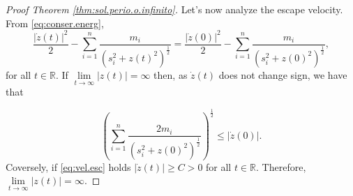 \documentclass[twoside]{article}
\theoremstyle{remark}
\newcommand{\rr}{\mathbb{R}}
\begin{document}
\begin{proof}[Proof  Theorem \ref{thm:sol.perio.o.infinito}]
Let's now analyze the escape velocity. From \eqref{eq:conser.energ}, 
\[\frac{|\dot{z}(t)|^2}{2}-\sum_{i=1}^{n} \frac{m_i}{\left(s_i^2+z(t)^2\right)^{\frac12}}=\frac{|\dot{z}(0)|^2}{2}-\sum_{i=1}^{n} \frac{m_i}{\left(s_i^2+z(0)^2\right)^{\frac12}},\]
for all $t\in\rr$. If $\lim\limits_{t\to\infty}|z(t)|=\infty$ then, as $\dot{z}(t)$ does not change sign, we have that

\begin{equation}\label{eq:vel.esc}
\left(\sum_{i=1}^{n} \frac{2m_i}{\left(s_i^2+z(0)^2\right)^{\frac12}}\right)^{\frac12}\leq |\dot{z}(0)|.
\end{equation}
Coversely, if \eqref{eq:vel.esc} holds $|\dot{z}(t)|\geq C>0$ for all $t\in\rr$. Therefore, $\lim\limits_{t\to\infty}|z(t)|=\infty$. 
\end{proof}
\end{document}
